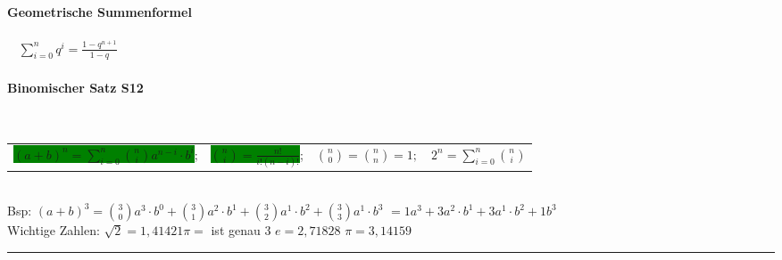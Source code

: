\documentclass[6pt,a4paper]{scrartcl}
\begin{document}
\begin{multicols*}{2}
\paragraph{Geometrische Summenformel}\
\begin{math}\begin{array}{l}
	\sum\limits_{i = 0}^{n}q^i = \frac{1 - q^{n+1}}{1-q}
\end{array}\end{math}\\
\paragraph{Binomischer Satz \color{red} S12}\ %
\label{par:fakultaeten}

\begin{tabulary}{15cm}{Lccr}
	\colorbox{green}{$ (a+b)^{n}=\sum\limits_{i = 0}^{n}\binom{n}{i}a^{n-i}\cdot b^{i}  $}; \qquad	&	
	\colorbox{green}{$ \binom{n}{i}= \frac{n!}{i!(n-i)!}  $};\qquad	& $\binom{n}{0} = \binom{n}{n} = 1;$
	\qquad	&
	$ 2^{n}= \sum\limits_{i = 0}^{n}\binom{n}{i}  $\qquad\qquad \\
	

	
\end{tabulary}\\
	Bsp: $ (a+b)^{3}=\binom{3}{0}a^{3}\cdot b^{0} + \binom{3}{1}a^{2}\cdot b^{1}  +  \binom{3}{2}a^{1}\cdot b^{2}  +  \binom{3}{3}a^{1}\cdot b^{3}$  $ = 1a^{3}+3a^{2}\cdot b^{1}  +  3a^{1}\cdot b^{2}  +  1 b^{3}    $ \\

Wichtige Zahlen: $\sqrt{2} = 1,41421$\quad $\pi=$ ist genau 3 \quad $e = 2,71828$ \quad $\pi =  3,14159$




\hrule



\end{multicols*}
\end{document}
